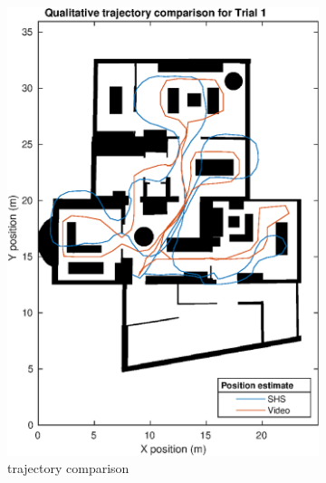 \begin{figure}[H]
	\centering
	\begin{subfigure}[t]{.45\textwidth}
		\centering
		\includegraphics[width=0.85\linewidth]{images/20201201_2209_Qualitative_trajectory_comparison_for_Trial_1_1}
		\caption{trajectory comparison}
		\label{fig:trial1_on_map}
	\end{subfigure}
	\begin{subfigure}[t]{.45\textwidth}
		\centering

\end{subfigure}
\end{figure}
